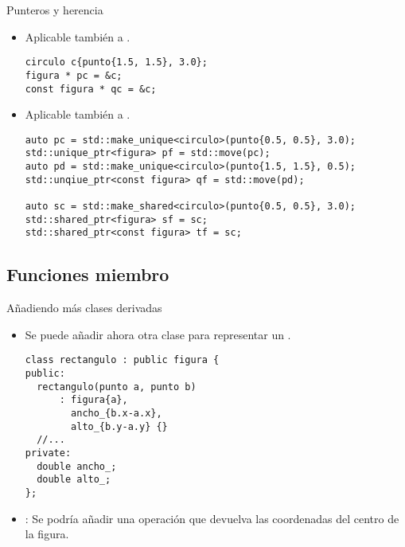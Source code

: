 \begin{frame}[t,fragile]{Punteros y herencia}
\begin{itemize}

  \item Aplicable también a .
\begin{lstlisting}
circulo c{punto{1.5, 1.5}, 3.0};
figura * pc = &c;
const figura * qc = &c;
\end{lstlisting}

  \item Aplicable también a .
\begin{lstlisting}
auto pc = std::make_unique<circulo>(punto{0.5, 0.5}, 3.0);
std::unique_ptr<figura> pf = std::move(pc);
auto pd = std::make_unique<circulo>(punto{1.5, 1.5}, 0.5);
std::unqiue_ptr<const figura> qf = std::move(pd);

auto sc = std::make_shared<circulo>(punto{0.5, 0.5}, 3.0);
std::shared_ptr<figura> sf = sc;
std::shared_ptr<const figura> tf = sc;
\end{lstlisting}

\end{itemize}
\end{frame}

\subsection{Funciones miembro}

\begin{frame}[t,fragile]{Añadiendo más clases derivadas}
\begin{itemize}
  \item Se puede añadir ahora otra clase para representar un .
\begin{lstlisting}
class rectangulo : public figura {
public:
  rectangulo(punto a, punto b) 
      : figura{a}, 
        ancho_{b.x-a.x},
        alto_{b.y-a.y} {}
  //...
private:
  double ancho_;
  double alto_;
};
\end{lstlisting}

  \item {}: Se podría añadir una operación 
        que devuelva las coordenadas del centro de la figura.
\end{itemize}
\end{frame}

